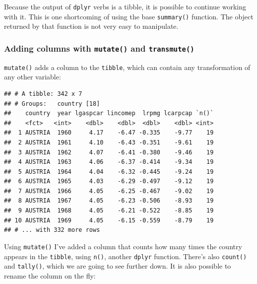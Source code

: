 \documentclass[]{gitbook}
\newenvironment{Shaded}{\begin{snugshade}}{\end{snugshade}}
\newcommand{\KeywordTok}[1]{\textcolor[rgb]{0.13,0.29,0.53}{\textbf{#1}}}
\newcommand{\NormalTok}[1]{#1}
\newcommand{\OperatorTok}[1]{\textcolor[rgb]{0.81,0.36,0.00}{\textbf{#1}}}
\newcommand{\StringTok}[1]{\textcolor[rgb]{0.31,0.60,0.02}{#1}}
\theoremstyle{definition}
\theoremstyle{definition}
\theoremstyle{definition}
\theoremstyle{remark}
\begin{document}
Because the output of \texttt{dplyr} verbs is a tibble, it is possible
to continue working with it. This is one shortcoming of using the base
\texttt{summary()} function. The object returned by that function is not
very easy to manipulate.

\hypertarget{adding-columns-with-mutate-and-transmute}{%
\subsubsection{\texorpdfstring{Adding columns with \texttt{mutate()} and
\texttt{transmute()}}{Adding columns with mutate() and transmute()}}\label{adding-columns-with-mutate-and-transmute}}

\texttt{mutate()} adds a column to the \texttt{tibble}, which can
contain any transformation of any other variable:

\begin{Shaded}
\end{Shaded}

\begin{verbatim}
## # A tibble: 342 x 7
## # Groups:   country [18]
##    country  year lgaspcar lincomep  lrpmg lcarpcap `n()`
##    <fct>   <int>    <dbl>    <dbl>  <dbl>    <dbl> <int>
##  1 AUSTRIA  1960     4.17    -6.47 -0.335    -9.77    19
##  2 AUSTRIA  1961     4.10    -6.43 -0.351    -9.61    19
##  3 AUSTRIA  1962     4.07    -6.41 -0.380    -9.46    19
##  4 AUSTRIA  1963     4.06    -6.37 -0.414    -9.34    19
##  5 AUSTRIA  1964     4.04    -6.32 -0.445    -9.24    19
##  6 AUSTRIA  1965     4.03    -6.29 -0.497    -9.12    19
##  7 AUSTRIA  1966     4.05    -6.25 -0.467    -9.02    19
##  8 AUSTRIA  1967     4.05    -6.23 -0.506    -8.93    19
##  9 AUSTRIA  1968     4.05    -6.21 -0.522    -8.85    19
## 10 AUSTRIA  1969     4.05    -6.15 -0.559    -8.79    19
## # ... with 332 more rows
\end{verbatim}

Using \texttt{mutate()} I've added a column that counts how many times
the country appears in the \texttt{tibble}, using \texttt{n()}, another
\texttt{dplyr} function. There's also \texttt{count()} and
\texttt{tally()}, which we are going to see further down. It is also
possible to rename the column on the fly:
\end{document}
